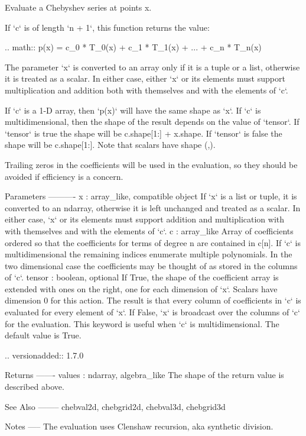 \begin{DoxyVerb}Evaluate a Chebyshev series at points x.

If `c` is of length `n + 1`, this function returns the value:

.. math:: p(x) = c_0 * T_0(x) + c_1 * T_1(x) + ... + c_n * T_n(x)

The parameter `x` is converted to an array only if it is a tuple or a
list, otherwise it is treated as a scalar. In either case, either `x`
or its elements must support multiplication and addition both with
themselves and with the elements of `c`.

If `c` is a 1-D array, then `p(x)` will have the same shape as `x`.  If
`c` is multidimensional, then the shape of the result depends on the
value of `tensor`. If `tensor` is true the shape will be c.shape[1:] +
x.shape. If `tensor` is false the shape will be c.shape[1:]. Note that
scalars have shape (,).

Trailing zeros in the coefficients will be used in the evaluation, so
they should be avoided if efficiency is a concern.

Parameters
----------
x : array_like, compatible object
    If `x` is a list or tuple, it is converted to an ndarray, otherwise
    it is left unchanged and treated as a scalar. In either case, `x`
    or its elements must support addition and multiplication with
    with themselves and with the elements of `c`.
c : array_like
    Array of coefficients ordered so that the coefficients for terms of
    degree n are contained in c[n]. If `c` is multidimensional the
    remaining indices enumerate multiple polynomials. In the two
    dimensional case the coefficients may be thought of as stored in
    the columns of `c`.
tensor : boolean, optional
    If True, the shape of the coefficient array is extended with ones
    on the right, one for each dimension of `x`. Scalars have dimension 0
    for this action. The result is that every column of coefficients in
    `c` is evaluated for every element of `x`. If False, `x` is broadcast
    over the columns of `c` for the evaluation.  This keyword is useful
    when `c` is multidimensional. The default value is True.

    .. versionadded:: 1.7.0

Returns
-------
values : ndarray, algebra_like
    The shape of the return value is described above.

See Also
--------
chebval2d, chebgrid2d, chebval3d, chebgrid3d

Notes
-----
The evaluation uses Clenshaw recursion, aka synthetic division.\end{DoxyVerb}
 \mbox{\label{namespacenumpy_1_1polynomial_1_1chebyshev_a1087d7c7038cdb34464d6a700543145f}} 
